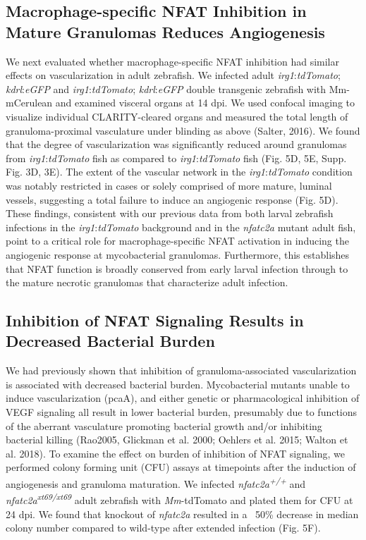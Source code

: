 \subsection{\mbox{Macrophage-specific} NFAT Inhibition in Mature Granulomas Reduces Angiogenesis}

We next evaluated whether macrophage-specific NFAT inhibition had similar effects on vascularization in adult zebrafish. We infected adult \textit{irg1}:\textit{tdTomato}; \textit{kdrl}:\textit{eGFP} and \textit{irg1}:\textit{tdTomato}; \textit{kdrl}:\textit{eGFP} double transgenic zebrafish with Mm-mCerulean and examined visceral organs at 14 dpi. We used confocal imaging to visualize individual CLARITY-cleared organs and measured the total length of granuloma-proximal vasculature under blinding as above (Salter, 2016). We found that the degree of vascularization was significantly reduced around granulomas from \textit{irg1}:\textit{tdTomato} fish as compared to \textit{irg1}:\textit{tdTomato} fish (Fig. 5D, 5E, Supp. Fig. 3D, 3E). The extent of the vascular network in the \textit{irg1}:\textit{tdTomato} condition was notably restricted in cases or solely comprised of more mature, luminal vessels, suggesting a total failure to induce an angiogenic response (Fig. 5D). These findings, consistent with our previous data from both larval zebrafish infections in the \textit{irg1}:\textit{tdTomato} background and in the \textit{nfatc2a} mutant adult fish, point to a critical role for macrophage-specific NFAT activation in inducing the angiogenic response at mycobacterial granulomas. Furthermore, this establishes that NFAT function is broadly conserved from early larval infection through to the mature necrotic granulomas that characterize adult infection.

\subsection{Inhibition of NFAT Signaling Results in Decreased Bacterial Burden}

We had previously shown that inhibition of granuloma-associated vascularization is associated with decreased bacterial burden. Mycobacterial mutants unable to induce vascularization (\textDelta pcaA), and either genetic or pharmacological inhibition of VEGF signaling all result in lower bacterial burden, presumably due to functions of the aberrant vasculature promoting bacterial growth and/or inhibiting bacterial killing (Rao2005, Glickman et al. 2000; Oehlers et al. 2015; Walton et al. 2018). To examine the effect on burden of inhibition of NFAT signaling, we performed colony forming unit (CFU) assays at timepoints after the induction of angiogenesis and granuloma maturation. We infected \textit{nfatc2a\textsuperscript{+/+}} and \textit{nfatc2a\textsuperscript{xt69/xt69}} adult zebrafish with \textit{Mm}-tdTomato and plated them for CFU at 24 dpi. We found that knockout of \textit{nfatc2a} resulted in a ~50\% decrease in median colony number compared to wild-type after extended infection (Fig. 5F). 

